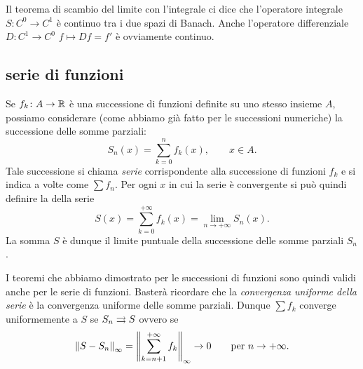 Il teorema di scambio del limite con l'integrale ci dice che
l'operatore integrale $S\colon C^0 \to C^1$ è continuo tra i due spazi di Banach. Anche l'operatore differenziale $D\colon C^1 \to C^0$ $f\mapsto Df = f'$ è ovviamente continuo.

\subsection{serie di funzioni}

Se $f_k\colon A \to \mathbb R$ è una successione di funzioni
definite su uno stesso insieme $A$, possiamo considerare (come abbiamo già fatto per le successioni numeriche) la successione delle somme parziali:
\[
  S_n(x) = \sum_{k=0}^n f_k(x), \qquad x\in A.
\]
Tale successione si chiama \emph{serie} corrispondente alla successione di funzioni $f_k$
e si indica a volte come $\sum f_n$. Per ogni $x$ in cui la serie è convergente si può quindi definire la
 della serie
\[
  S(x) = \sum_{k=0}^{+\infty} f_k(x) = \lim_{n\to +\infty} S_n(x).
\]
La somma $S$ è dunque il limite puntuale della successione delle somme parziali $S_n$.

I teoremi che abbiamo dimostrato per le successioni di funzioni sono quindi validi anche per le serie di funzioni. Basterà ricordare che la \emph{convergenza uniforme della serie}
%
%
%
 è la convergenza uniforme delle somme parziali. Dunque $\sum f_k$ converge uniformemente a $S$ se $S_n \rightrightarrows S$ ovvero se
\[
  {\left\Vert S - S_n\right\Vert}_\infty = {\left\Vert \sum_{k=n+1}^{+\infty} f_k\right\Vert}_\infty \to 0
  \qquad \text{per $n\to +\infty$.}
\]



